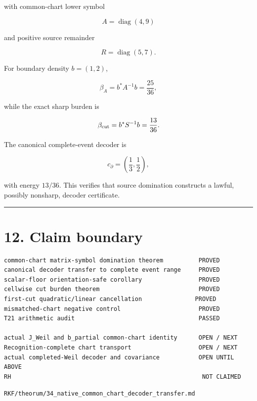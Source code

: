with common-chart lower symbol

\[
A=\operatorname{diag}(4,9)
\]

and positive source remainder

\[
R=\operatorname{diag}(5,7).
\]

For boundary density \(b=(1,2)\),

\[
\beta_A=b^*A^{-1}b=\frac{25}{36},
\]

while the exact sharp burden is

\[
\beta_{\rm cut}=b^*S^{-1}b=\frac{13}{36}.
\]

The canonical complete-event decoder is

\[
c_\partial=\left(\frac13,\frac12\right),
\]

with energy \(13/36\). This verifies that source domination constructs a
lawful, possibly nonsharp, decoder certificate.

\begin{center}\rule{0.5\linewidth}{0.5pt}\end{center}

\hypertarget{claim-boundary}{%
\section{12. Claim boundary}\label{claim-boundary}}

\begin{verbatim}
common-chart matrix-symbol domination theorem          PROVED
canonical decoder transfer to complete event range     PROVED
scalar-floor orientation-safe corollary                PROVED
cellwise cut burden theorem                            PROVED
first-cut quadratic/linear cancellation               PROVED
mismatched-chart negative control                      PROVED
T21 arithmetic audit                                   PASSED

actual J_Weil and b_partial common-chart identity      OPEN / NEXT
Recognition-complete chart transport                   OPEN / NEXT
actual completed-Weil decoder and covariance           OPEN UNTIL ABOVE
RH                                                      NOT CLAIMED
\end{verbatim}

\begin{flushright}\small\texttt{RKF/theorum/34\_native\_common\_chart\_decoder\_transfer.md}\end{flushright}
